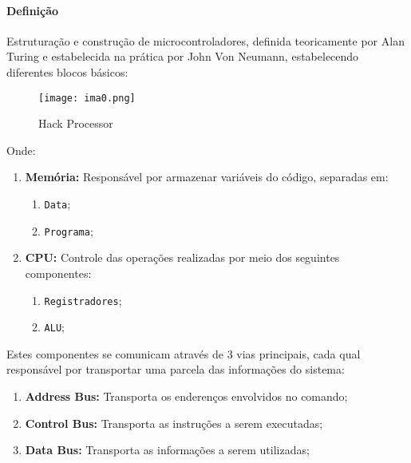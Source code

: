 \documentclass{article}
\begin{document}
            \paragraph{Definição}Estruturação e construção de microcontroladores, definida teoricamente por Alan Turing e estabelecida na prática por John Von Neumann, estabelecendo diferentes blocos básicos:
                \begin{figure}[H]
                    \centering
                    \texttt{[image: ima0.png]}
                    \caption{Hack Processor}\label{fig:hackProcessor}
                \end{figure} \noindent
            Onde:
                \begin{enumerate}[rightmargin = \leftmargin, noitemsep]
                    \item \textbf{Memória:} Responsável por armazenar variáveis do código, separadas em:
                        \begin{enumerate}[rightmargin = \leftmargin, noitemsep]
                            \item \texttt{Data};
                            \item \texttt{Programa};
                        \end{enumerate}
                    \item \textbf{CPU:} Controle das operações realizadas por meio dos seguintes componentes:
                        \begin{enumerate}[rightmargin = \leftmargin, noitemsep]
                            \item \texttt{Registradores};
                            \item \texttt{ALU};
                        \end{enumerate}
                \end{enumerate}
            Estes componentes se comunicam através de 3 vias principais, cada qual responsável por transportar uma parcela das informações do sistema:
                \begin{enumerate}[rightmargin = \leftmargin, noitemsep]
                    \item \textbf{Address Bus:} Transporta os enderenços envolvidos no comando;
                    \item \textbf{Control Bus:} Transporta as instruções a serem executadas;
                    \item \textbf{Data Bus:} Transporta as informações a serem utilizadas;
                \end{enumerate}
\end{document}
